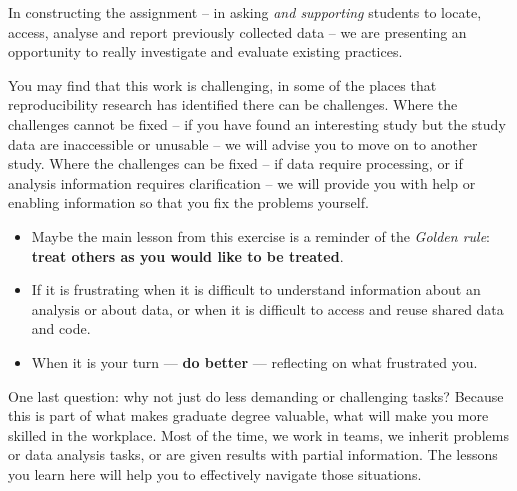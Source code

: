 \documentclass[
  letterpaper,
  DIV=11,
  numbers=noendperiod]{scrreprt}
\providecommand{\tightlist}{%
  \setlength{\itemsep}{0pt}\setlength{\parskip}{0pt}}\usepackage{longtable,booktabs,array}
\begin{document}
In constructing the assignment -- in asking \emph{and supporting}
students to locate, access, analyse and report previously collected data
-- we are presenting an opportunity to really investigate and evaluate
existing practices.

You may find that this work is challenging, in some of the places that
reproducibility research has identified there can be challenges. Where
the challenges cannot be fixed -- if you have found an interesting study
but the study data are inaccessible or unusable -- we will advise you to
move on to another study. Where the challenges can be fixed -- if data
require processing, or if analysis information requires clarification --
we will provide you with help or enabling information so that you fix
the problems yourself.

\begin{tcolorbox}[enhanced jigsaw, opacitybacktitle=0.6, title=\textcolor{quarto-callout-tip-color}{\faLightbulb}\hspace{0.5em}{Tip}, arc=.35mm, colbacktitle=quarto-callout-tip-color!10!white, colframe=quarto-callout-tip-color-frame, leftrule=.75mm, opacityback=0, breakable, titlerule=0mm, left=2mm, bottomrule=.15mm, toprule=.15mm, colback=white, coltitle=black, bottomtitle=1mm, toptitle=1mm, rightrule=.15mm]

\begin{itemize}
\tightlist
\item
  Maybe the main lesson from this exercise is a reminder of the
  \emph{Golden rule}: \textbf{treat others as you would like to be
  treated}.
\item
  If it is frustrating when it is difficult to understand information
  about an analysis or about data, or when it is difficult to access and
  reuse shared data and code.
\item
  When it is your turn --- \textbf{do better} --- reflecting on what
  frustrated you.
\end{itemize}

\end{tcolorbox}

One last question: why not just do less demanding or challenging tasks?
Because this is part of what makes graduate degree valuable, what will
make you more skilled in the workplace. Most of the time, we work in
teams, we inherit problems or data analysis tasks, or are given results
with partial information. The lessons you learn here will help you to
effectively navigate those situations.
\end{document}
